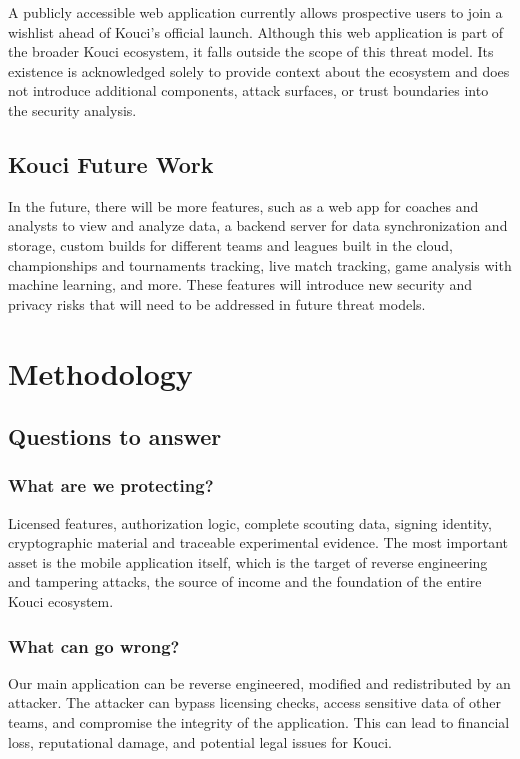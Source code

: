 \documentclass{article}
\newcounter{threat}
\begin{document}
A publicly accessible web application currently allows prospective users to join a wishlist ahead of Kouci's official launch. Although this web application is part of the broader Kouci ecosystem, it falls outside the scope of this threat model. Its existence is acknowledged solely to provide context about the ecosystem and does not introduce additional components, attack surfaces, or trust boundaries into the security analysis.

\subsection{Kouci Future Work}

In the future, there will be more features, such as a web app for coaches and analysts to view and analyze data, a backend server for data synchronization and storage, custom builds for different teams and leagues built in the cloud, championships and tournaments tracking, live match tracking, game analysis with machine learning, and more. These features will introduce new security and privacy risks that will need to be addressed in future threat models.

\section{Methodology}

\subsection{Questions to answer}

\subsubsection{What are we protecting?}

Licensed features, authorization logic, complete scouting data, signing identity, cryptographic material and traceable experimental evidence. The most important asset is the mobile application itself, which is the target of reverse engineering and tampering attacks, the source of income and the foundation of the entire Kouci ecosystem. 

\subsubsection{What can go wrong?}

Our main application can be reverse engineered, modified and redistributed by an attacker. The attacker can bypass licensing checks, access sensitive data of other teams, and compromise the integrity of the application. This can lead to financial loss, reputational damage, and potential legal issues for Kouci.
\end{document}
